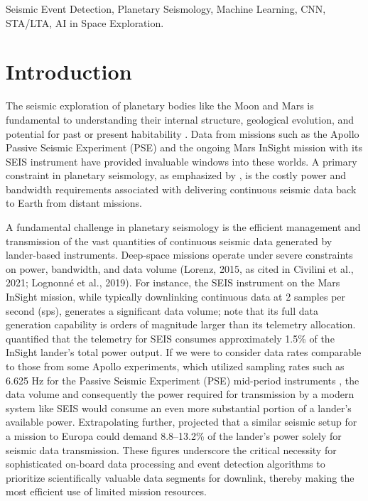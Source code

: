 \documentclass[conference]{IEEEtran}
\begin{document}
\begin{IEEEkeywords}
    Seismic Event Detection, Planetary Seismology, Machine Learning,
    CNN, STA/LTA, AI in Space Exploration.
\end{IEEEkeywords}

\section{Introduction}
    The seismic exploration of planetary bodies like the Moon and Mars is fundamental to understanding their internal
    structure, geological evolution, and potential for past or present habitability \cite{Lognonne2005, Lognonne2019}.
    Data from missions such as the Apollo Passive Seismic Experiment (PSE) \cite{Nakamura1982} and the ongoing Mars
    InSight mission with its SEIS instrument\cite{Lognonne2019} have provided invaluable windows into these worlds. A
    primary constraint in planetary seismology, as emphasized by \cite{Civilini2021}, is the costly power and bandwidth
    requirements associated with delivering continuous seismic data back to Earth from distant missions.

    A fundamental challenge in planetary seismology is the efficient management and transmission of the vast quantities
    of continuous seismic data generated by lander-based instruments. Deep-space missions operate under severe
    constraints on power, bandwidth, and data volume (Lorenz, 2015, as cited in Civilini et al., 2021; Lognonné et al.,
    2019). For instance, the SEIS instrument on the Mars InSight mission, while typically downlinking continuous data at
    2 samples per second (sps), generates a significant data volume; \cite{Lognonne2019} note that its full data
    generation capability is orders of magnitude larger than its telemetry allocation. \cite{Civilini2021} quantified
    that the telemetry for SEIS consumes approximately 1.5\% of the InSight lander's total power output. If we were to
    consider data rates comparable to those from some Apollo experiments, which utilized sampling rates such as 6.625 Hz
    for the Passive Seismic Experiment (PSE) mid-period instruments \cite{Nunn2020}, the data volume and consequently
    the power required for transmission by a modern system like SEIS would consume an even more substantial portion of a
    lander's available power. Extrapolating further, \cite{Civilini2021} projected that a similar seismic setup for a
    mission to Europa could demand 8.8–13.2\% of the lander's power solely for seismic data transmission. These figures
    underscore the critical necessity for sophisticated on-board data processing and event detection algorithms to
    prioritize scientifically valuable data segments for downlink, thereby making the most efficient use of limited
    mission resources.
\end{document}
